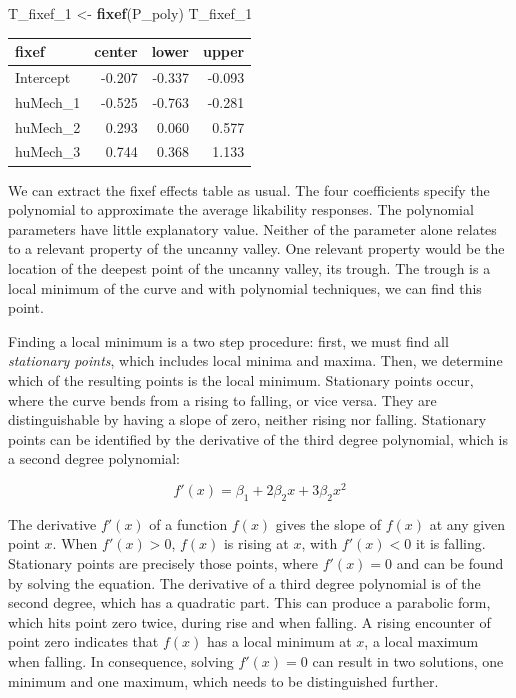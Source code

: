 \documentclass[]{svmono}
\newenvironment{Shaded}{\begin{snugshade}}{\end{snugshade}}
\newcommand{\KeywordTok}[1]{\textcolor[rgb]{0.13,0.29,0.53}{\textbf{#1}}}
\newcommand{\DecValTok}[1]{\textcolor[rgb]{0.00,0.00,0.81}{#1}}
\newcommand{\StringTok}[1]{\textcolor[rgb]{0.31,0.60,0.02}{#1}}
\newcommand{\NormalTok}[1]{#1}
\theoremstyle{definition}
\theoremstyle{definition}
\theoremstyle{definition}
\theoremstyle{remark}
\begin{document}
\begin{Shaded}
\begin{Highlighting}[]
\NormalTok{T_fixef_}\DecValTok{1}\NormalTok{ <-}\StringTok{ }\KeywordTok{fixef}\NormalTok{(P_poly)}
\NormalTok{T_fixef_}\DecValTok{1}
\end{Highlighting}
\end{Shaded}

\begin{longtable}[]{@{}lrrr@{}}
\toprule
fixef & center & lower & upper\tabularnewline
\midrule
\endhead
Intercept & -0.207 & -0.337 & -0.093\tabularnewline
huMech\_1 & -0.525 & -0.763 & -0.281\tabularnewline
huMech\_2 & 0.293 & 0.060 & 0.577\tabularnewline
huMech\_3 & 0.744 & 0.368 & 1.133\tabularnewline
\bottomrule
\end{longtable}

We can extract the fixef effects table as usual. The four coefficients
specify the polynomial to approximate the average likability responses.
The polynomial parameters have little explanatory value. Neither of the
parameter alone relates to a relevant property of the uncanny valley.
One relevant property would be the location of the deepest point of the
uncanny valley, its trough. The trough is a local minimum of the curve
and with polynomial techniques, we can find this point.

Finding a local minimum is a two step procedure: first, we must find all
\emph{stationary points}, which includes local minima and maxima. Then,
we determine which of the resulting points is the local minimum.
Stationary points occur, where the curve bends from a rising to falling,
or vice versa. They are distinguishable by having a slope of zero,
neither rising nor falling. Stationary points can be identified by the
derivative of the third degree polynomial, which is a second degree
polynomial:

\[f'(x) = \beta_1 + 2\beta_2x + 3\beta_2x^2\]

The derivative \(f'(x)\) of a function \(f(x)\) gives the slope of
\(f(x)\) at any given point \(x\). When \(f'(x) > 0\), \(f(x)\) is
rising at \(x\), with \(f'(x) < 0\) it is falling. Stationary points are
precisely those points, where \(f'(x) = 0\) and can be found by solving
the equation. The derivative of a third degree polynomial is of the
second degree, which has a quadratic part. This can produce a parabolic
form, which hits point zero twice, during rise and when falling. A
rising encounter of point zero indicates that \(f(x)\) has a local
minimum at \(x\), a local maximum when falling. In consequence, solving
\(f'(x) = 0\) can result in two solutions, one minimum and one maximum,
which needs to be distinguished further.
\end{document}
